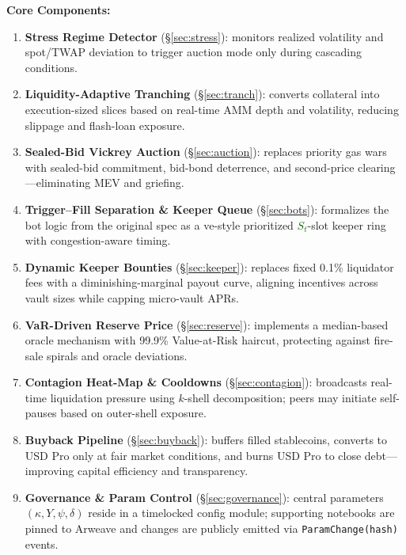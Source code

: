 \documentclass[11pt]{article}
\newcommand{\secref}[1]{\hyperref[#1]{\S\ref*{#1}}}
\begin{document}
\vspace{1em}
\noindent
\textbf{Core Components:}
\begin{enumerate}[label=\textbf{\arabic*.},wide, labelindent=0pt]
  \item \textbf{Stress Regime Detector} (\secref{sec:stress}): monitors realized volatility and spot/TWAP deviation to trigger auction mode only during cascading conditions.

  \item \textbf{Liquidity-Adaptive Tranching} (\secref{sec:tranch}): converts collateral into execution-sized slices based on real-time AMM depth and volatility, reducing slippage and flash-loan exposure.

  \item \textbf{Sealed-Bid Vickrey Auction} (\secref{sec:auction}): replaces priority gas wars with sealed-bid commitment, bid-bond deterrence, and second-price clearing—eliminating MEV and griefing.

  \item \textbf{Trigger–Fill Separation \& Keeper Queue} (\secref{sec:bots}): formalizes the bot logic from the original spec as a ve-style prioritized \textcolor{darkgreen}{$S_{t}$}-slot keeper ring with congestion-aware timing.

  \item \textbf{Dynamic Keeper Bounties} (\secref{sec:keeper}): replaces fixed 0.1\% liquidator fees with a diminishing-marginal payout curve, aligning incentives across vault sizes while capping micro-vault APRs.

  \item \textbf{VaR-Driven Reserve Price} (\secref{sec:reserve}): implements a median-based oracle mechanism with 99.9\% Value-at-Risk haircut, protecting against fire-sale spirals and oracle deviations.

  \item \textbf{Contagion Heat-Map \& Cooldowns} (\secref{sec:contagion}): broadcasts real-time liquidation pressure using $k$-shell decomposition; peers may initiate self-pauses based on outer-shell exposure.

  \item \textbf{Buyback Pipeline} (\secref{sec:buyback}): buffers filled stablecoins, converts to USD Pro only at fair market conditions, and burns USD Pro to close debt—improving capital efficiency and transparency.

  \item \textbf{Governance \& Param Control} (\secref{sec:governance}): central parameters \((\kappa, Y, \psi, \delta)\) reside in a timelocked config module; supporting notebooks are pinned to Arweave and changes are publicly emitted via \texttt{ParamChange(hash)} events.
\end{enumerate}
\end{document}
